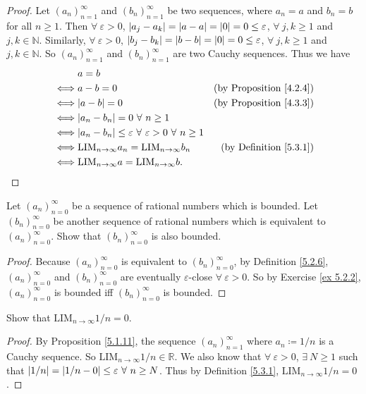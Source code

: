 \begin{proof}
Let \((a_n)_{n = 1}^{\infty}\) and \((b_n)_{n = 1}^{\infty}\) be two sequences, where \(a_n = a\) and \(b_n = b\) for all \(n \geq 1\).
Then \(\forall\ \varepsilon > 0\), \(\abs*{a_j - a_k} = \abs*{a - a} = \abs*{0} = 0 \leq \varepsilon\), \(\forall\ j, k \geq 1\) and \(j, k \in \mathds{N}\).
Similarly, \(\forall\ \varepsilon > 0\), \(\abs*{b_j - b_k} = \abs*{b - b} = \abs*{0} = 0 \leq \varepsilon\), \(\forall\ j, k \geq 1\) and \(j, k \in \mathds{N}\).
So \((a_n)_{n = 1}^{\infty}\) and \((b_n)_{n = 1}^{\infty}\) are two Cauchy sequences.
Thus we have
\begin{align*}
& a = b \\
\iff & a - b = 0 & \text{(by Proposition \ref{4.2.4})} \\
\iff & \abs*{a - b} = 0 & \text{(by Proposition \ref{4.3.3})} \\
\iff & \abs*{a_n - b_n} = 0 \ \forall\ n \geq 1 \\
\iff & \abs*{a_n - b_n} \leq \varepsilon \ \forall\ \varepsilon > 0 \ \forall\ n \geq 1 \\
\iff & \text{LIM}_{n \to \infty} a_n = \text{LIM}_{n \to \infty} b_n & \text{(by Definition \ref{5.3.1})} \\
\iff & \text{LIM}_{n \to \infty} a = \text{LIM}_{n \to \infty} b.
\end{align*}
\end{proof}

\begin{exercise}\label{ex 5.3.4}
Let \((a_n)_{n = 0}^{\infty}\) be a sequence of rational numbers which is bounded.
Let \((b_n)_{n = 0}^{\infty}\) be another sequence of rational numbers which is equivalent to \((a_n)_{n = 0}^{\infty}\).
Show that \((b_n)_{n = 0}^{\infty}\) is also bounded.
\end{exercise}

\begin{proof}
Because \((a_n)_{n = 0}^{\infty}\) is equivalent to \((b_n)_{n = 0}^{\infty}\), by Definition \ref{5.2.6}, \((a_n)_{n = 0}^{\infty}\) and \((b_n)_{n = 0}^{\infty}\) are eventually \(\varepsilon\)-close \(\forall\ \varepsilon > 0\).
So by Exercise \ref{ex 5.2.2}, \((a_n)_{n = 0}^{\infty}\) is bounded iff \((b_n)_{n = 0}^{\infty}\) is bounded.
\end{proof}

\begin{exercise}\label{ex 5.3.5}
Show that \(\text{LIM}_{n \to \infty} 1 / n = 0\).
\end{exercise}

\begin{proof}
By Proposition \ref{5.1.11}, the sequence \((a_n)_{n = 1}^{\infty}\) where \(a_n \coloneqq 1 / n\) is a Cauchy sequence.
So \(\text{LIM}_{n \to \infty} 1 / n \in \mathds{R}\).
We also know that \(\forall\ \varepsilon > 0\), \(\exists\ N \geq 1\) such that \(\abs*{1 / n} = \abs*{1 / n - 0} \leq \varepsilon \ \forall\ n \geq N\).
Thus by Definition \ref{5.3.1}, \(\text{LIM}_{n \to \infty} 1 / n = 0\).
\end{proof}